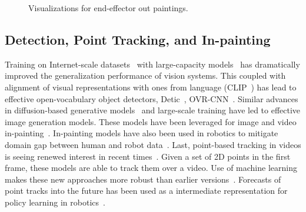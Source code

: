\begin{figure}
\setlength{\tabcolsep}{2pt}
\caption{Visualizations for end-effector out paintings.}
\end{figure}

\subsection{Detection, Point Tracking, and In-painting}
Training on Internet-scale datasets~\cite{radford2021learning, achiam2023gpt,
kirillov2023segment} with large-capacity models~\cite{dosovitskiy2021image} has dramatically improved the generalization performance of
vision systems. This coupled with alignment of visual representations with ones
from language (\eg CLIP~\cite{radford2021learning}) has lead to
effective open-vocabulary object detectors, \eg Detic~\cite{zhou2022detecting},
OVR-CNN~\cite{zareian2021open}.
Similar advances in diffusion-based generative
models~\cite{sohl2015deep, rombach2021high, ho2020denoising, song2020score} and
large-scale training have led to effective image generation models. These models have been leveraged for image and video
in-painting~\cite{zhou2023propainter, chang2023look}. In-painting models have
also been used in robotics to mitigate domain gap between human and
robot data~\cite{bahl2022human, chang2023look}. 
Last, point-based tracking in videos is seeing renewed interest in recent
times~\cite{harley2022particle, karaev2023cotracker, doersch2023tapir,
zheng2023pointodyssey}. Given a set of 2D points in the first frame, these
models are able to track them over a video. Use of machine learning makes
these new approaches more robust than earlier versions~\cite{shi1994good}. Forecasts of point tracks into the future has been
used as a intermediate representation for policy learning in
robotics~\cite{wen2023any, bharadhwaj2024track2act}.